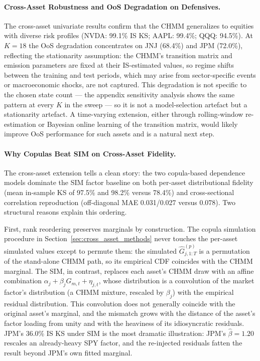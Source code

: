 \paragraph{Cross-Asset Robustness and OoS Degradation on Defensives.}
The cross-asset univariate results confirm that the CHMM generalizes to equities with diverse risk profiles (NVDA: 99.1\% IS KS; AAPL: 99.4\%; QQQ: 94.5\%).
At $K = 18$ the OoS degradation concentrates on JNJ (68.4\%) and JPM (72.0\%), reflecting the stationarity assumption: the CHMM's transition matrix and emission parameters are fixed at their IS-estimated values, so regime shifts between the training and test periods, which may arise from sector-specific events or macroeconomic shocks, are not captured.
This degradation is not specific to the chosen state count --- the appendix sensitivity analysis shows the same pattern at every $K$ in the sweep --- so it is not a model-selection artefact but a stationarity artefact.
A time-varying extension, either through rolling-window re-estimation or Bayesian online learning of the transition matrix, would likely improve OoS performance for such assets and is a natural next step.

\paragraph{Why Copulas Beat SIM on Cross-Asset Fidelity.}
The cross-asset extension tells a clean story: the two copula-based dependence models dominate the SIM factor baseline on both per-asset distributional fidelity (mean in-sample KS of 97.5\% and 98.2\% versus 78.4\%) and cross-sectional correlation reproduction (off-diagonal MAE 0.031/0.027 versus 0.078).
Two structural reasons explain this ordering.

First, rank reordering preserves marginals by construction.
The copula simulation procedure in Section~\ref{sec:cross_asset_methods} never touches the per-asset simulated values except to permute them: the simulated $\hat{G}_{j,1:T}^{(p)}$ is a permutation of the stand-alone CHMM path, so its empirical CDF coincides with the CHMM marginal.
The SIM, in contrast, replaces each asset's CHMM draw with an affine combination $\alpha_j + \beta_j G_{m,t} + \eta_{j,t}$, whose distribution is a convolution of the market factor's distribution (a CHMM mixture, rescaled by $\beta_j$) with the empirical residual distribution.
This convolution does not generally coincide with the original asset's marginal, and the mismatch grows with the distance of the asset's factor loading from unity and with the heaviness of its idiosyncratic residuals.
JPM's 36.0\% IS KS under SIM is the most dramatic illustration: JPM's $\hat{\beta} = 1.20$ rescales an already-heavy SPY factor, and the re-injected residuals fatten the result beyond JPM's own fitted marginal.

